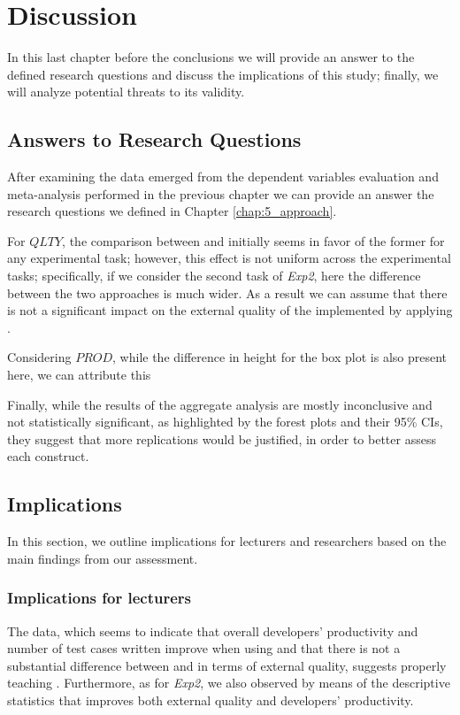 \chapter{Discussion}
\label{chap:6_discussion}
In this last chapter before the conclusions we will provide an answer to the defined research questions and discuss the implications of this study; finally, we will analyze potential threats to its validity.

\section{Answers to Research Questions}
After examining the data emerged from the dependent variables evaluation and meta-analysis performed in the previous chapter we can provide an answer the research questions we defined in Chapter \ref{chap:5_approach}.

For $QLTY$, the comparison between \tdd and \notdd initially seems in favor of the former for any experimental task; however, this effect is not uniform across the experimental tasks; specifically, if we consider the second task of \textit{Exp2}, here the difference between the two approaches is much wider. As a result we can assume that there is not a significant impact on the external quality of the implemented \es by applying \tdd. 

Considering $PROD$, 
while the difference in height for the box plot is also present here, we can attribute this

Finally, while the results of the aggregate analysis are mostly inconclusive and not statistically significant, as highlighted by the forest plots and their 95\% CIs, they suggest that more replications would be justified, in order to better assess each construct.




\section{Implications}
In this section, we outline implications for lecturers and researchers based on the main findings from our assessment. 

\subsection{Implications for lecturers}
The data, which seems to indicate that overall developers' productivity and number of test cases written improve when using \tdd and that there is not a substantial difference between \tdd and \notdd in terms of external quality, suggests properly teaching \tdd. Furthermore, as for \textit{Exp2}, we also observed by means of the descriptive statistics that \tdd improves both external quality and developers' productivity. 

